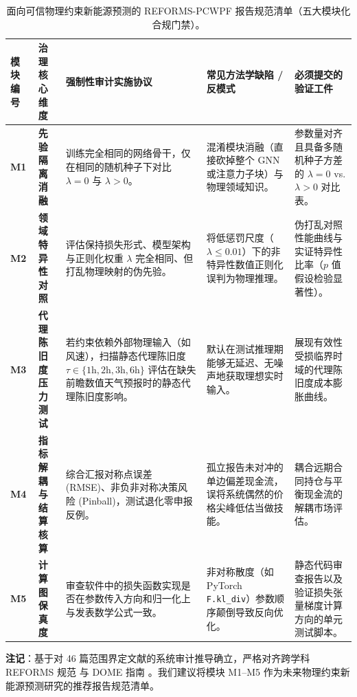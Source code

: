 \begin{table}[!t]
\centering
\footnotesize
\renewcommand{\arraystretch}{0.88}
\setlength{\tabcolsep}{3.5pt}
\caption{面向可信物理约束新能源预测的 REFORMS-PCWPF 报告规范清单（五大模块化合规门禁）。}
\label{tab:reforms_checklist}
\begin{threeparttable}
\begin{tabularx}{\textwidth}{p{1.2cm}p{2.6cm}>{\raggedright\arraybackslash}X>{\raggedright\arraybackslash}Xp{3.2cm}}
\toprule
\textbf{模块编号} & \textbf{治理核心维度} & \textbf{强制性审计实施协议} & \textbf{常见方法学缺陷 / 反模式} & \textbf{必须提交的验证工件} \\
\midrule
\textbf{M1} & \textbf{先验隔离消融} & 训练完全相同的网络骨干，仅在相同的随机种子下对比 $\lambda=0$ 与 $\lambda>0$。 & 混淆模块消融（直接砍掉整个 GNN 或注意力子块）与物理领域知识。 & 参数量对齐且具备多随机种子方差的 $\lambda=0$ vs. $\lambda>0$ 对比表。 \\
\midrule
\textbf{M2} & \textbf{领域特异性对照} & 评估保持损失形式、模型架构与正则化权重 $\lambda$ 完全相同、但打乱物理映射的伪先验。 & 将低惩罚尺度（$\lambda \le 0.01$）下的非特异性数值正则化误判为物理推理。 & 伪打乱对照性能曲线与实证特异性比率（$p$ 值假设检验显著性）。 \\
\midrule
\textbf{M3} & \textbf{代理陈旧度压力测试} & 若约束依赖外部物理输入（如风速），扫描静态代理陈旧度 $\tau \in \{1\text{h}, 2\text{h}, 3\text{h}, 6\text{h}\}$ 评估在缺失前瞻数值天气预报时的静态代理陈旧度影响。 & 默认在测试推理期能够无延迟、无噪声地获取理想实时输入。 & 展现有效性受损临界时域的代理陈旧度成本膨胀曲线。 \\
\midrule
\textbf{M4} & \textbf{指标解耦与结算核算} & 综合汇报对称点误差 (RMSE)、非负非对称决策风险 (Pinball)，测试退化零申报反例。 & 孤立报告未对冲的单边偏差现金流，误将系统偶然的价格尖峰低估当做技能。 & 耦合远期合同持仓与平衡现金流的解耦市场评估。 \\
\midrule
\textbf{M5} & \textbf{计算图保真度} & 审查软件中的损失函数实现是否在参数传入方向和归一化上与发表数学公式一致。 & 非对称散度（如 PyTorch \texttt{F.kl\_div}）参数顺序颠倒导致反向优化。 & 静态代码审查报告以及验证损失张量梯度计算方向的单元测试脚本。 \\
\bottomrule
\end{tabularx}
\begin{tablenotes}[flushleft]
\footnotesize
\item \textbf{注记}：基于对 46 篇范围界定文献的系统审计推导确立，严格对齐跨学科 REFORMS 规范 \cite{kapoor2024reforms} 与 DOME 指南 \cite{walsh2021dome}。我们建议将模块 M1--M5 作为未来物理约束新能源预测研究的推荐报告规范清单。
\end{tablenotes}
\end{threeparttable}
\end{table}

